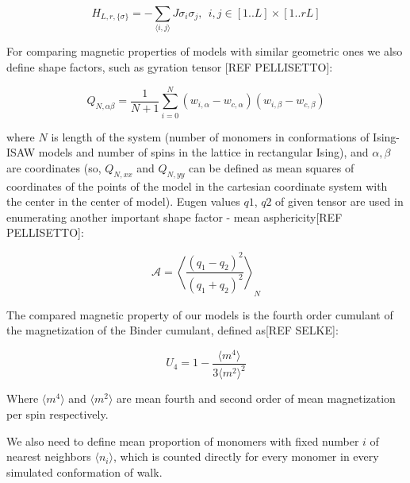 \documentclass[aps,pre,amssymb,amsmath,twocolumn,floatfix]{revtex4-2}
\begin{document}
\begin{equation}\label{H_Ising_Rectan}
  H_{L, r, \{\sigma\}} = - \sum_{\langle i,j \rangle} J  \sigma_{i}  \sigma_{j},\ \ i,j \in [1..L] \times [1..rL]
\end{equation}


For comparing magnetic properties of models with similar geometric ones we also define shape factors, such as gyration tensor [REF PELLISETTO]:

\begin{equation}\label{eq:Ten_G1}
    Q_{N,\alpha\beta} = \frac{1}{N+1} \sum^{N}_{i=0}(w_{i,\alpha} - w_{c, \alpha})(w_{i,\beta} - w_{c, \beta})
\end{equation}

where $N$ is length of the system (number of monomers in conformations of Ising-ISAW models and number of spins in the lattice in rectangular Ising), and  $\alpha,\beta$ are coordinates (so, $Q_{N, xx}$ and $Q_{N,yy}$ can be defined as mean squares of coordinates of the points of the model in the cartesian coordinate system with the center in the center of model). Eugen values $q1$, $q2$ of given tensor are used in enumerating another important shape factor - mean asphericity[REF PELLISETTO]:

\begin{equation}
\label{eq:Asphericity}
    \mathcal{A} = \left\langle \frac{(q_{1} - q_{2})^{2}}{(q_{1} + q_{2})^{2}} \right\rangle_{N}
\end{equation}


The compared magnetic property of our models is the fourth order cumulant of the magnetization of the Binder cumulant, defined as[REF SELKE]:

\begin{equation}
\label{eq:Cumulant}
U_{4} = 1 - \frac{\langle m^{4} \rangle}{3 \langle m^{2} \rangle^{2}}
\end{equation}

Where $\langle m^{4} \rangle$ and $\langle m^{2} \rangle$ are mean fourth and second order of mean magnetization per spin respectively.

We also need to define mean proportion of monomers with fixed number $i$ of nearest neighbors $\langle n_{i} \rangle$, which is counted directly for every monomer in every simulated conformation of walk.
\end{document}
